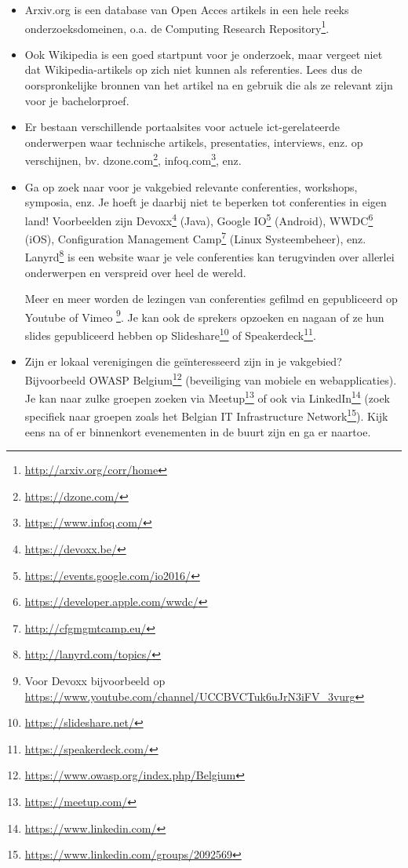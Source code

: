 \begin{itemize}
  \item Arxiv.org is een database van Open Acces artikels in een hele reeks onderzoeksdomeinen, o.a. de Computing Research Repository\footnote{\url{http://arxiv.org/corr/home}}.
  
  \item Ook Wikipedia is een goed startpunt voor je onderzoek, maar vergeet niet dat Wikipedia-artikels op zich niet kunnen als referenties. Lees dus de oorspronkelijke bronnen van het artikel na en gebruik die als ze relevant zijn voor je bachelorproef.
  
  \item Er bestaan verschillende portaalsites voor actuele ict-gerelateerde onderwerpen waar technische artikels, presentaties, interviews, enz. op verschijnen, bv. dzone.com\footnote{\url{https://dzone.com/}}, infoq.com\footnote{\url{https://www.infoq.com/}}, enz.
  
  \item Ga op zoek naar voor je vakgebied relevante conferenties, workshops, symposia, enz. Je hoeft je daarbij niet te beperken tot conferenties in eigen land! Voorbeelden zijn Devoxx\footnote{\url{https://devoxx.be/}} (Java), Google IO\footnote{\url{https://events.google.com/io2016/}} (Android), WWDC\footnote{\url{https://developer.apple.com/wwdc/}} (iOS), Configuration Management Camp\footnote{\url{http://cfgmgmtcamp.eu/}} (Linux Systeembeheer), enz. Lanyrd\footnote{\url{http://lanyrd.com/topics/}} is een website waar je vele conferenties kan terugvinden over allerlei onderwerpen en verspreid over heel de wereld.
  
  Meer en meer worden de lezingen van conferenties gefilmd en gepubliceerd op Youtube of Vimeo \footnote{Voor Devoxx bijvoorbeeld op \url{https://www.youtube.com/channel/UCCBVCTuk6uJrN3iFV\_3vurg}}. Je kan ook de sprekers opzoeken en nagaan of ze hun slides gepubliceerd hebben op Slideshare\footnote{\url{https://slideshare.net/}} of Speakerdeck\footnote{\url{https://speakerdeck.com/}}.
  
  \item Zijn er lokaal verenigingen die geïnteresseerd zijn in je vakgebied? Bijvoorbeeld OWASP Belgium\footnote{\url{https://www.owasp.org/index.php/Belgium}} (beveiliging van mobiele en webapplicaties). Je kan naar zulke groepen zoeken via Meetup\footnote{\url{https://meetup.com/}} of ook via LinkedIn\footnote{\url{https://www.linkedin.com/}} (zoek specifiek naar groepen zoals het Belgian IT Infrastructure Network\footnote{\url{https://www.linkedin.com/groups/2092569}}). Kijk eens na of er binnenkort evenementen in de buurt zijn en ga er naartoe.
  

\end{itemize}
